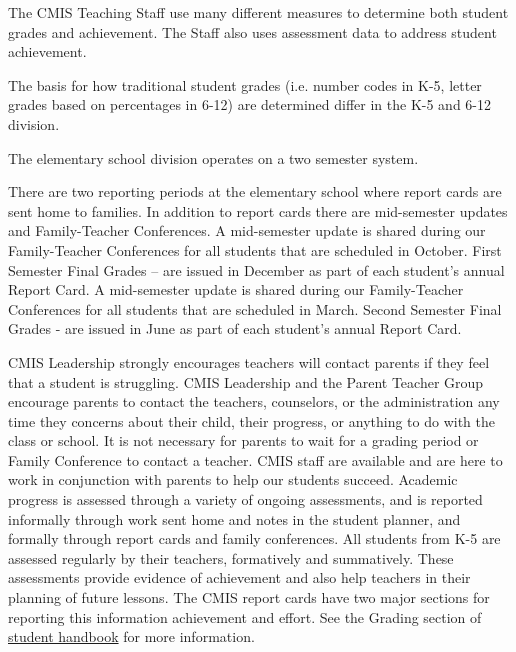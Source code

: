 \begin{findings}
The CMIS Teaching Staff use many different measures to determine both student grades and achievement. The Staff also uses assessment data to address student achievement. 

The basis for how traditional student grades (i.e. number codes in K-5, letter grades based on percentages in 6-12) are determined differ in the K-5 and 6-12 division. 

 
The elementary school division operates on a two semester system. 

There are two reporting periods at the elementary school where report cards are sent home to families. In addition to report cards there are mid-semester updates and Family-Teacher Conferences. A mid-semester update is shared during our Family-Teacher Conferences for all students that are scheduled in October. First Semester Final Grades – are issued in December as part of each student’s annual Report Card. A mid-semester update is shared during our Family-Teacher Conferences for all students that are scheduled in March. Second Semester Final Grades - are issued in June as part of each student’s annual Report Card.

CMIS Leadership strongly encourages teachers will contact parents if they feel that a student is struggling. CMIS Leadership and the Parent Teacher Group encourage parents to contact the teachers, counselors, or the administration any time they concerns about their child, their progress, or anything to do with the class or school. It is not necessary for parents to wait for a grading period or Family Conference to contact a teacher. CMIS staff are available and are here to work in conjunction with parents to help our students succeed. Academic progress is assessed through a variety of ongoing assessments, and is reported informally through work sent home and notes in the student planner, and formally through report cards and family conferences.
All students from K-5 are assessed regularly by their teachers, formatively and summatively. These assessments provide evidence of achievement and also help teachers in their planning of future lessons. The CMIS report cards have two major sections for reporting this information achievement and effort. See the Grading section of \href{https://docs.google.com/document/d/1bIbV9pgGz2vpXYJdnRzL_Od5PS35egy7lgBOBuszgD4/edit#heading=h.2vxh95cg5cjg}{student handbook} for more information. 


\end{findings}
